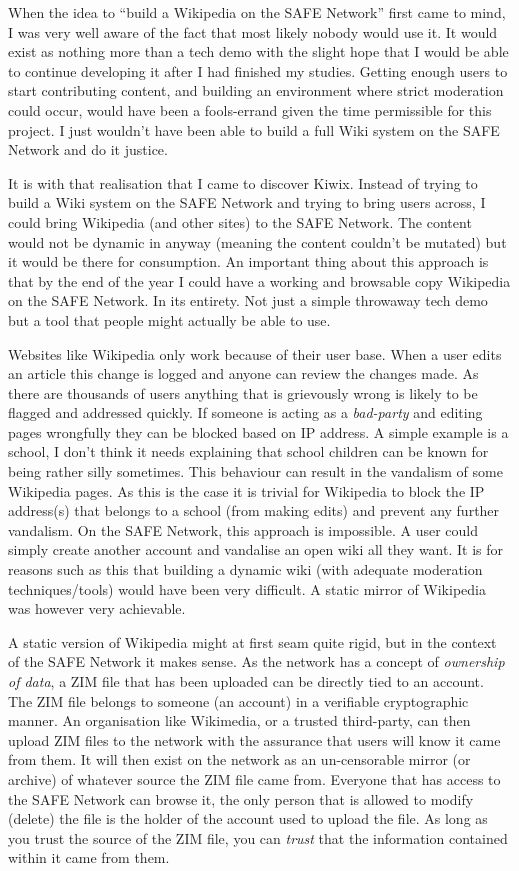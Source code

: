 When the idea to ``build a Wikipedia on the SAFE Network'' first came to mind, I was very well aware of the fact that most likely nobody would use it. It would exist as nothing more than a tech demo with the slight hope that I would be able to continue developing it after I had finished my studies. Getting enough users to start contributing content, and building an environment where strict moderation could occur, would have been a fools-errand given the time permissible for this project. I just wouldn't have been able to build a full Wiki system on the SAFE Network and do it justice.

It is with that realisation that I came to discover Kiwix. Instead of trying to build a Wiki system on the SAFE Network and trying to bring users across, I could bring Wikipedia (and other sites) to the SAFE Network. The content would not be dynamic in anyway (meaning the content couldn't be mutated) but it would be there for consumption. An important thing about this approach is that by the end of the year I could have a working and browsable copy Wikipedia on the SAFE Network. In its entirety. Not just a simple throwaway tech demo but a tool that people might actually be able to use.

Websites like Wikipedia only work because of their user base. When a user edits an article this change is logged and anyone can review the changes made. As there are thousands of users anything that is grievously wrong is likely to be flagged and addressed quickly. If someone is acting as a \textit{bad-party} and editing pages wrongfully they can be blocked based on IP address. A simple example is a school, I don't think it needs explaining that school children can be known for being rather silly sometimes. This behaviour can result in the vandalism of some Wikipedia pages. As this is the case it is trivial for Wikipedia to block the IP address(s) that belongs to a school (from making edits) and prevent any further vandalism. On the SAFE Network, this approach is impossible. A user could simply create another account and vandalise an open wiki all they want. It is for reasons such as this that building a dynamic wiki (with adequate moderation techniques/tools) would have been very difficult. A static mirror of Wikipedia was however very achievable.

A static version of Wikipedia might at first seam quite rigid, but in the context of the SAFE Network it makes sense. As the network has a concept of \textit{ownership of data}, a ZIM file that has been uploaded can be directly tied to an account. The ZIM file belongs to someone (an account) in a verifiable cryptographic manner. An organisation like Wikimedia, or a trusted third-party, can then upload ZIM files to the network with the assurance that users will know it came from them. It will then exist on the network as an un-censorable mirror (or archive) of whatever source the ZIM file came from. Everyone that has access to the SAFE Network can browse it, the only person that is allowed to modify (delete) the file is the holder of the account used to upload the file. As long as you trust the source of the ZIM file, you can \textit{trust} that the information contained within it came from them.

